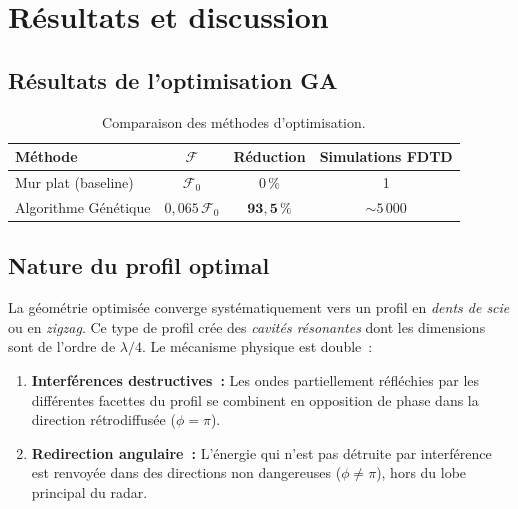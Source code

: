 \documentclass[12pt,a4paper]{article}
\numberwithin{equation}{section}
\numberwithin{figure}{section}
\numberwithin{table}{section}
\begin{document}
\section{Résultats et discussion}

\subsection{Résultats de l'optimisation GA}

\begin{table}[h!]
\centering
\caption{Comparaison des méthodes d'optimisation.}
\label{tab:results}
\begin{tabular}{lccc}
\toprule
\textbf{Méthode} & $\mathcal{F}$ & Réduction & Simulations FDTD \\
\midrule
Mur plat (baseline) & $\mathcal{F}_0$ & $0\,\%$ & 1 \\
Algorithme Génétique & $0{,}065\,\mathcal{F}_0$ & $\mathbf{93{,}5\,\%}$ & $\sim 5\,000$ \\
\bottomrule
\end{tabular}
\end{table}

\subsection{Nature du profil optimal}

La géométrie optimisée converge systématiquement vers un profil en \emph{dents
de scie} ou en \emph{zigzag}. Ce type de profil crée des \emph{cavités
résonantes} dont les dimensions sont de l'ordre de $\lambda/4$.
Le mécanisme physique est double~:
\begin{enumerate}
    \item \textbf{Interférences destructives~:} Les ondes partiellement
    réfléchies par les différentes facettes du profil se combinent en
    opposition de phase dans la direction rétrodiffusée ($\phi = \pi$).
    \item \textbf{Redirection angulaire~:} L'énergie qui n'est pas détruite
    par interférence est renvoyée dans des directions non dangereuses
    ($\phi \neq \pi$), hors du lobe principal du radar.
\end{enumerate}
\end{document}
